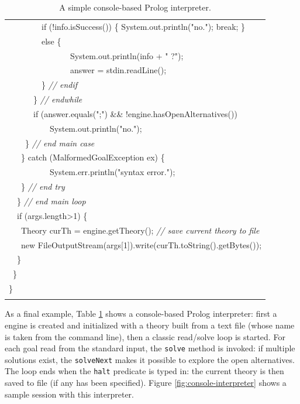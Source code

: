 \begin{table}
\begin{center}
{\begin{tabular}{p{14cm}}
    ~~~~~~~~if (!info.isSuccess()) \{ System.out.println("no."); break; \}\\
    ~~~~~~~~else \{\\
    ~~~~~~~~~~~~~~~System.out.println(info + " ?");\\
    ~~~~~~~~~~~~~~~answer = stdin.readLine();\\
    ~~~~~~~~\} \textit{// endif}\\
    ~~~~~~\} \textit{// endwhile}\\
    ~~~~~~if (answer.equals(";") \&\& !engine.hasOpenAlternatives())\\
    ~~~~~~~~~~System.out.println("no.");\\
    ~~~~\} \textit{// end main case}\\
    ~~~\} catch (MalformedGoalException ex) \{\\
    ~~~~~~~~~~System.err.println("syntax error.");\\
    ~~~\} \textit{// end try}\\
    ~~\} \textit{// end main loop}\\
    ~~if (args.length>1) \{\\
    ~~~Theory curTh = engine.getTheory(); \textit{// save current theory to file}\\
    ~~~new
    FileOutputStream(args[1]).write(curTh.toString().getBytes());\\
    ~~\}\\
    ~\}\\
    \}\\
    \\\hline
    \end{tabular}}
    \end{center}
    \caption{A simple console-based Prolog interpreter.}
    \label{tab:console-sample}
\end{table}

As a final example, Table \ref{tab:console-sample} shows a console-based Prolog interpreter: first a \tuprolog{} engine is created and initialized with a theory built from a text file (whose name is taken from the command line), then a classic read/solve loop is started.
%
For each goal read from the standard input, the \texttt{solve} method is invoked: if multiple solutions exist, the \texttt{solveNext} makes it possible to explore the open
alternatives.
%
The loop ends when the \texttt{halt} predicate is typed in: the current theory is then saved to file (if any has been specified).
Figure \ref{fig:console-interpreter} shows a sample session with this interpreter.

